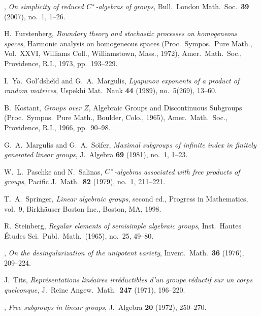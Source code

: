 \documentclass{amsart}
\def\mlprime{\/{\mathsurround=0pt$'$}}
\theoremstyle{plain}
\theoremstyle{definition}
\theoremstyle{remark}
\begin{document}
\begin{thebibliography}{10}
\bysame, \emph{On simplicity of reduced ${C}\sp \ast$-algebras of
  groups}, Bull.\ London Math.\ Soc.\ \textbf{39} (2007), no.~1, 1--26.

H.~Furstenberg, \emph{Boundary theory and stochastic processes on homogeneous
  spaces}, Harmonic analysis on homogeneous spaces (Proc.\ Sympos.\ Pure Math.,
  Vol.\ XXVI, Williams Coll., Williamstown, Mass., 1972), Amer.\ Math.\ Soc.,
  Providence, R.I., 1973, pp.~193--229.

I.~Ya.~Gol{\mlprime}dshe{\u\i}d and G.~A.~Margulis, \emph{Lyapunov exponents of
  a product of random matrices}, Uspekhi Mat.\ Nauk \textbf{44} (1989),
  no.~5(269), 13--60.

B.~Kostant, \emph{Groups over {$Z$}}, Algebraic {G}roups and {D}iscontinuous
  {S}ubgroups ({P}roc.\ {S}ympos.\ {P}ure {M}ath., {B}oulder, {C}olo., 1965),
  Amer.\ Math.\ Soc., Providence, R.I., 1966, pp.~90--98.

G.~A.~Margulis and G.~A.~So{\u\i}fer, \emph{Maximal subgroups of infinite index
  in finitely generated linear groups}, J.\ Algebra \textbf{69} (1981), no.~1,
  1--23.

W.~L.~Paschke and N.~Salinas, \emph{${C}\sp{\ast} $-algebras associated with
  free products of groups}, Pacific J.\ Math.\ \textbf{82} (1979), no.~1,
  211--221.

T.~A.~Springer, \emph{Linear algebraic groups}, second ed., Progress in
  Mathematics, vol.~9, Birkh\"auser Boston Inc., Boston, MA, 1998.

R.~Steinberg, \emph{Regular elements of semisimple algebraic groups}, Inst.\ 
  Hautes \'Etudes Sci.\ Publ.\ Math.\ (1965), no.~25, 49--80.

\bysame, \emph{On the desingularization of the unipotent variety}, Invent.\ 
  Math.\ \textbf{36} (1976), 209--224.

J.~Tits, \emph{Repr\'esentations lin\'eaires irr\'eductibles d'un groupe
  r\'eductif sur un corps quelconque}, J.\ Reine Angew.\ Math.\ \textbf{247}
  (1971), 196--220.

\bysame, \emph{Free subgroups in linear groups}, J.\ Algebra \textbf{20} (1972),
  250--270.

\end{thebibliography}
\end{document}
